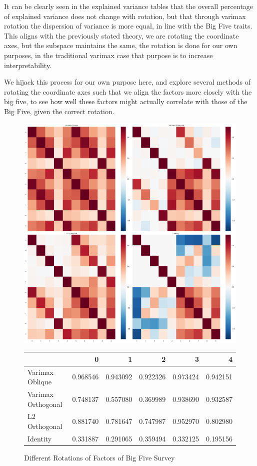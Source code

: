 \documentclass[a4paper,12pt]{article}
\begin{document}
It can be clearly seen in the explained variance tables that the overall percentage of explained variance does not change with rotation, but that through varimax rotation the dispersion of variance is more equal, in line with the Big Five traits. This aligns with the previously stated theory, we are rotating the coordinate axes, but the subspace maintains the same, the rotation is done for our own purposes, in the traditional varimax case that purpose is to increase interpretability.

We hijack this process for our own purpose here, and explore several methods of rotating the coordinate axes such that we align the factors more closely with the big five, to see how well these factors might actually correlate with those of the Big Five, given the correct rotation.

\begin{figure}
\includegraphics[width=\linewidth]{images/grid_bf.png}
\begin{tabular}{lrrrrr}
\toprule
{} &         0 &         1 &         2 &         3 &         4 \\
\midrule
Varimax Oblique    &  0.968546 &  0.943092 &  0.922326 &  0.973424 &  0.942151 \\
Varimax Orthogonal &  0.748137 &  0.557080 &  0.369989 &  0.938690 &  0.932587 \\
L2 Orthogonal      &  0.881740 &  0.781647 &  0.747987 &  0.952970 &  0.802980 \\
Identity           &  0.331887 &  0.291065 &  0.359494 &  0.332125 &  0.195156 \\
\bottomrule
\end{tabular}
\caption{Different Rotations of Factors of Big Five Survey}\label{fig:grid-bf}
\end{figure}
\end{document}
